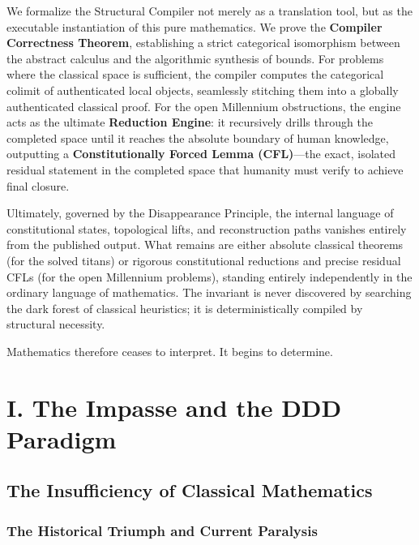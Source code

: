 \documentclass[12pt,openany]{extbook}
\theoremstyle{plain}
\theoremstyle{definition}
\begin{document}
We formalize the Structural Compiler not merely as a translation tool, but as the executable instantiation of this pure mathematics. We prove the \textbf{Compiler Correctness Theorem}, establishing a strict categorical isomorphism between the abstract calculus and the algorithmic synthesis of bounds. For problems where the classical space is sufficient, the compiler computes the categorical colimit of authenticated local objects, seamlessly stitching them into a globally authenticated classical proof. For the open Millennium obstructions, the engine acts as the ultimate \textbf{Reduction Engine}: it recursively drills through the completed space until it reaches the absolute boundary of human knowledge, outputting a \textbf{Constitutionally Forced Lemma (CFL)}---the exact, isolated residual statement in the completed space that humanity must verify to achieve final closure.

Ultimately, governed by the Disappearance Principle, the internal language of constitutional states, topological lifts, and reconstruction paths vanishes entirely from the published output. What remains are either absolute classical theorems (for the solved titans) or rigorous constitutional reductions and precise residual CFLs (for the open Millennium problems), standing entirely independently in the ordinary language of mathematics. The invariant is never discovered by searching the dark forest of classical heuristics; it is deterministically compiled by structural necessity.

Mathematics therefore ceases to interpret. It begins to determine.








\mainmatter
{}

\part{I. The Impasse and the DDD Paradigm}

\chapter{The Insufficiency of Classical Mathematics}

\section{The Historical Triumph and Current Paralysis}
\end{document}
